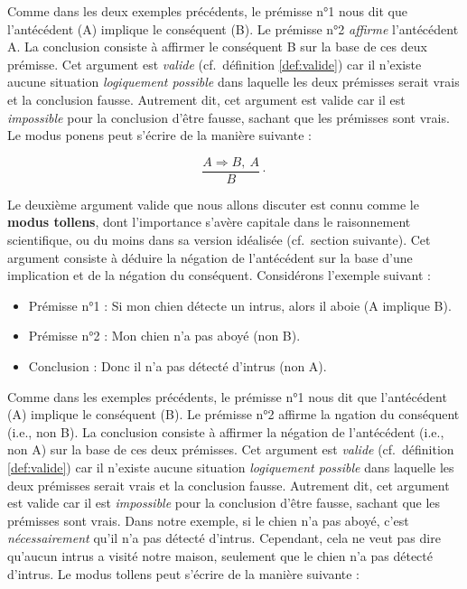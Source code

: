\documentclass[
  a4paper,11pt,twoside,onecolumn,openright,final,oldfontcommands]{memoir}
\providecommand{\tightlist}{%
  \setlength{\itemsep}{0pt}\setlength{\parskip}{0pt}}
\theoremstyle{definition}
\theoremstyle{definition}
\theoremstyle{definition}
\theoremstyle{definition}
\theoremstyle{remark}
\begin{document}
Comme dans les deux exemples précédents, le prémisse n°1 nous dit que l'antécédent (A) implique le conséquent (B). Le prémisse n°2 \emph{affirme} l'antécédent A. La conclusion consiste à affirmer le conséquent B sur la base de ces deux prémisse. Cet argument est \emph{valide} (cf.~définition \ref{def:valide}) car il n'existe aucune situation \emph{logiquement possible} dans laquelle les deux prémisses serait vrais et la conclusion fausse. Autrement dit, cet argument est valide car il est \emph{impossible} pour la conclusion d'être fausse, sachant que les prémisses sont vrais. Le modus ponens peut s'écrire de la manière suivante :

\[\dfrac{A \Rightarrow B, \ A}{B} \cdot\]

Le deuxième argument valide que nous allons discuter est connu comme le \textbf{modus tollens}, dont l'importance s'avère capitale dans le raisonnement scientifique, ou du moins dans sa version idéalisée (cf.~section suivante). Cet argument consiste à déduire la négation de l'antécédent sur la base d'une implication et de la négation du conséquent. Considérons l'exemple suivant :

\begin{itemize}
\tightlist
\item
  Prémisse n°1 : Si mon chien détecte un intrus, alors il aboie (A implique B).
\item
  Prémisse n°2 : Mon chien n'a pas aboyé (non B).
\item
  Conclusion : Donc il n'a pas détecté d'intrus (non A).
\end{itemize}

Comme dans les exemples précédents, le prémisse n°1 nous dit que l'antécédent (A) implique le conséquent (B). Le prémisse n°2 affirme la ngation du conséquent (i.e., non B). La conclusion consiste à affirmer la négation de l'antécédent (i.e., non A) sur la base de ces deux prémisses. Cet argument est \emph{valide} (cf.~définition \ref{def:valide}) car il n'existe aucune situation \emph{logiquement possible} dans laquelle les deux prémisses serait vrais et la conclusion fausse. Autrement dit, cet argument est valide car il est \emph{impossible} pour la conclusion d'être fausse, sachant que les prémisses sont vrais. Dans notre exemple, si le chien n'a pas aboyé, c'est \emph{nécessairement} qu'il n'a pas détecté d'intrus. Cependant, cela ne veut pas dire qu'aucun intrus a visité notre maison, seulement que le chien n'a pas détecté d'intrus. Le modus tollens peut s'écrire de la manière suivante :
\end{document}

